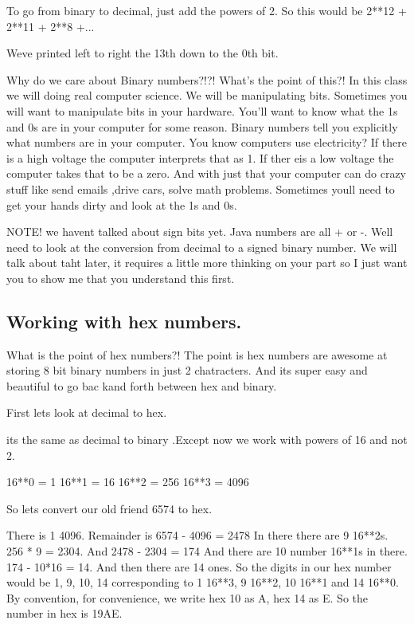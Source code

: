 \documentclass[12pt]{article}
\begin{document}
To go from binary to decimal, just add the powers of 2. 
So this would be 
2**12 + 2**11 + 2**8 +...

Weve printed left to right the 13th down to the 0th bit.

Why do we care about Binary numbers?!?! What's the point of this?! 
In this class we will doing real computer science. We will be manipulating bits.
Sometimes you will want to manipulate bits in your hardware. You'll want to know
what the 1s and 0s are in your computer for some reason. Binary numbers tell you
explicitly what numbers are in your computer. You know computers use
electricity? If there is a high voltage the computer interprets that as 1. If
ther eis a low voltage the computer takes that to be a zero. And with just that
your computer can do crazy stuff like send emails ,drive cars, solve math
problems. Sometimes youll need to get your hands dirty and look at the 1s and
0s.

NOTE! we havent talked about sign bits yet. Java numbers are all + or -. Well
need to look at the conversion from decimal to a signed binary number. We will
talk about taht later, it requires a little more thinking on your part so I just
want you to show me that you understand this first.

\subsection{Working with hex numbers.}

What is the point of hex numbers?! The point is hex numbers are awesome at
storing 8 bit  binary numbers in just 2 chatracters. And its super easy and
beautiful to go bac kand forth between hex and binary.

First lets look at decimal to hex.

its the same as decimal to binary .Except now we work with powers of 16 and not
2.

16**0 = 1
16**1 = 16
16**2 = 256
16**3 = 4096

So lets convert our old friend 6574 to hex.

There is 1 4096. Remainder is 6574 - 4096 = 2478
In there there are 9 16**2s. 256 * 9 = 2304. And 2478 - 2304 = 174
And there are 10 number 16**1s in there. 174 - 10*16 = 14.
And then there are 14 ones.
So the digits in our hex number would be 
1, 9, 10, 14 corresponding to 1 16**3, 9 16**2, 10 16**1 and 14 16**0.
By convention, for convenience, we write hex 10 as A, hex 14 as E.
So the number in hex is 19AE.
\end{document}
